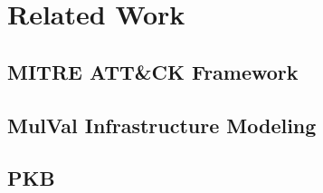 \chapter{Related Work}

\section{MITRE ATT\&CK Framework}\label{sec:related:mitre}

\section{MulVal Infrastructure Modeling}\label{sec:related:mulval}

\section{PKB}\label{sec:related:pkb}